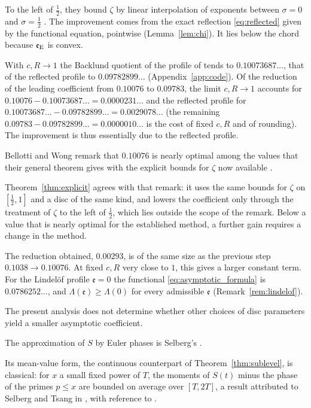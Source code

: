 \documentclass[11pt,a4paper]{article}
\makeatletter
\numberwithin{equation}{section}
\DeclareRobustCommand{\CGref}[1]{\ref{#1}}
\DeclareRobustCommand{\CGeqref}[1]{\eqref{#1}}
\DeclareRobustCommand{\CGcite}[2][]{\if\relax\detokenize{#1}\relax\cite{#2}\else\cite[#1]{#2}\fi}
\let\CG@origref\ref
\let\CG@origeqref\eqref
\newcommand{\CG@gettip}[1]{\@ifundefined{CGTip@#1}{#1}{\csname CGTip@#1\endcsname}}
\newcommand{\CG@getbib}[1]{\@ifundefined{CGBib@#1}{#1}{\csname CGBib@#1\endcsname}}
\DeclareRobustCommand{\CGref}[1]{\pdftooltip{\CG@origref{#1}}{\CG@gettip{#1}}}
\DeclareRobustCommand{\CGeqref}[1]{\pdftooltip{\CG@origeqref{#1}}{\CG@gettip{#1}}}
\DeclareRobustCommand{\CGcite}[2][]{\pdftooltip{\if\relax\detokenize{#1}\relax\cite{#2}\else\cite[#1]{#2}\fi}{\CG@getbib{#2}}}
\theoremstyle{definition}
\theoremstyle{remark}
\newcommand{\eE}{\mathfrak e_{\rm E}}
\makeatother
\begin{document}
To the left of $\frac12$, they bound $\zeta$ by linear interpolation of exponents between $\sigma=0$ and $\sigma=\frac12$ \CGcite[\S3.1]{BellottiWong2025}. The improvement comes from the exact reflection \CGeqref{eq:reflected} given by the functional equation, pointwise (Lemma~\CGref{lem:chi}). It lies below the chord because $\eE$ is convex.

\par
With $c,R\to1$ the Backlund quotient of the profile of \CGcite{BellottiWong2025} tends to $0.10073687\ldots$, that of the reflected profile to $0.09782899\ldots$ (Appendix~\CGref{app:code}). Of the reduction of the leading coefficient from $0.10076$ to $0.09783$, the limit $c,R\to1$ accounts for $0.10076-0.10073687\ldots=0.0000231\ldots$ and the reflected profile for $0.10073687\ldots-0.09782899\ldots=0.0029078\ldots$ (the remaining $0.09783-0.09782899\ldots=0.0000010\ldots$ is the cost of fixed $c,R$ and of rounding). The improvement is thus essentially due to the reflected profile.

Bellotti and Wong remark that $0.10076$ is nearly optimal among the values that their general theorem gives with the explicit bounds for $\zeta$ now available \CGcite[\S1]{BellottiWong2025}.

Theorem~\CGref{thm:explicit} agrees with that remark: it uses the same bounds for $\zeta$ on $[\frac12,1]$ and a disc of the same kind, and lowers the coefficient only through the treatment of $\zeta$ to the left of $\frac12$, which lies outside the scope of the remark. Below a value that is nearly optimal for the established method, a further gain requires a change in the method.

The reduction obtained, $0.00293$, is of the same size as the previous step $0.1038\to0.10076$. At fixed $c,R$ very close to $1$, this gives a larger constant term. For the Lindel\"of profile $\mathfrak e=0$ the functional \CGeqref{eq:asymptotic_formula} is $0.0786252\ldots$, and $\Lambda(\mathfrak e)\ge\Lambda(0)$ for every admissible $\mathfrak e$ (Remark~\CGref{rem:lindelof}).

The present analysis does not determine whether other choices of disc parameters yield a smaller asymptotic coefficient.

The approximation of $S$ by Euler phases is Selberg's \CGcite{Selberg1946a}.

Its mean-value form, the continuous counterpart of Theorem~\CGref{thm:sublevel}, is classical: for $x$ a small fixed power of $T$, the moments of $S(t)$ minus the phase of the primes $p\le x$ are bounded on average over $[T,2T]$, a result attributed to Selberg and Tsang in \CGcite[\S3, before (3.6)]{FazzariGerspachMinelli2025}, with reference to \CGcite[Thm.~5.1]{Tsang1984}.
\end{document}
